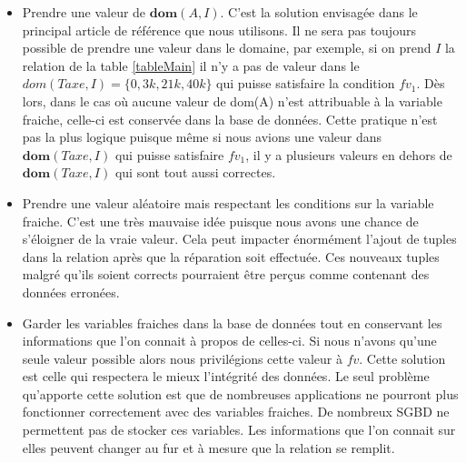 \documentclass[letterpaper, 12pt]{report}
\theoremstyle{definition}
\newcommand{\dom}{\mathbf{dom}}
\begin{document}
\begin{itemize}
	\item Prendre une valeur de $\dom(A,I)$. C'est la solution envisagée dans le principal article de référence que nous utilisons. Il ne sera pas toujours possible de prendre une valeur dans le domaine, par exemple, si on prend $I$ la relation de la table \ref{tableMain} il n'y a pas de valeur dans le $dom(Taxe,I)= \{0,3k,21k,40k\}$ qui puisse satisfaire la condition $fv_1$. Dès lors, dans le cas où aucune valeur de dom(A) n'est attribuable à la variable fraiche, celle-ci est conservée dans la base de données. Cette pratique n'est pas la plus logique puisque même si nous avions une valeur dans $\dom(Taxe,I)$ qui puisse satisfaire $fv_1$, il y a plusieurs valeurs en dehors de $\dom(Taxe,I)$ qui sont tout aussi correctes.
	\item Prendre une valeur aléatoire mais respectant les conditions sur la variable fraiche. C'est une très mauvaise idée puisque nous avons une chance de s'éloigner de la vraie valeur. Cela peut impacter énormément l'ajout de tuples dans la relation après que la réparation soit effectuée. Ces nouveaux tuples malgré qu'ils soient corrects pourraient être perçus comme contenant des données erronées.
	\item Garder les variables fraiches dans la base de données tout en conservant les informations que l'on connait à propos de celles-ci. Si nous n'avons qu'une seule valeur possible alors nous privilégions cette valeur à $fv$. Cette solution est celle qui respectera le mieux l'intégrité des données. Le seul problème qu'apporte cette solution est que de nombreuses applications ne pourront plus fonctionner correctement avec des variables fraiches. De nombreux SGBD ne permettent pas de stocker ces variables. Les informations que l'on connait sur elles peuvent changer au fur et à mesure que la relation se remplit.
\end{itemize}
\end{document}
